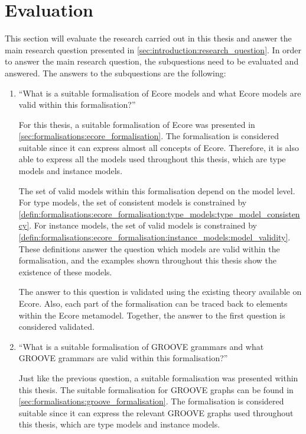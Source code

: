 \section{Evaluation}
\label{sec:conclusion:evaluation}

This section will evaluate the research carried out in this thesis and answer the main research question presented in \cref{sec:introduction:research_question}. In order to answer the main research question, the subquestions need to be evaluated and answered. The answers to the subquestions are the following:

\begin{enumerate}
    \item ``What is a suitable formalisation of Ecore models and what Ecore models are valid within this formalisation?'' 
    
    For this thesis, a suitable formalisation of Ecore was presented in \cref{sec:formalisations:ecore_formalisation}. The formalisation is considered suitable since it can express almost all concepts of Ecore. Therefore, it is also able to express all the models used throughout this thesis, which are type models and instance models.
    
    The set of valid models within this formalisation depend on the model level. For type models, the set of consistent models is constrained by \cref{defin:formalisations:ecore_formalisation:type_models:type_model_consistency}. For instance models, the set of valid models is constrained by \cref{defin:formalisations:ecore_formalisation:instance_models:model_validity}. These definitions answer the question which models are valid within the formalisation, and the examples shown throughout this thesis show the existence of these models.
    
    The answer to this question is validated using the existing theory available on Ecore. Also, each part of the formalisation can be traced back to elements within the Ecore metamodel. Together, the answer to the first question is considered validated.
    
    \item ``What is a suitable formalisation of GROOVE grammars and what GROOVE grammars are valid within this formalisation?'' 
    
    Just like the previous question, a suitable formalisation was presented within this thesis. The suitable formalisation for GROOVE graphs can be found in \cref{sec:formalisations:groove_formalisation}. The formalisation is considered suitable since it can express the relevant GROOVE graphs used throughout this thesis, which are type models and instance models.
    

\end{enumerate}
